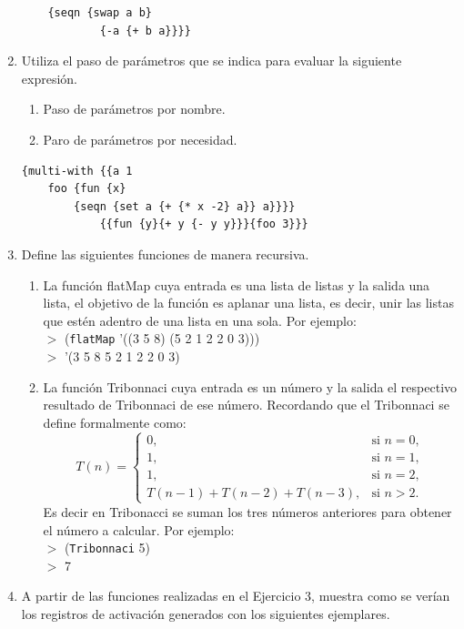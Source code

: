 \documentclass[11pt]{article}
\begin{document}
\begin{enumerate}[leftmargin=0.8cm]
\begin{lstlisting}
    {seqn {swap a b}
            {-a {+ b a}}}}
    \end{lstlisting}
    \item Utiliza el paso de parámetros que se indica para evaluar la siguiente expresión.
    \begin{enumerate}
        \item Paso de parámetros por nombre.
        \item Paro de parámetros por necesidad.\\
    \end{enumerate}
    \begin{lstlisting}
{multi-with {{a 1
    foo {fun {x}
        {seqn {set a {+ {* x -2} a}} a}}}}
            {{fun {y}{+ y {- y y}}}{foo 3}}}
    \end{lstlisting}
    \item Define las siguientes funciones de manera recursiva.
    \begin{enumerate}
        \item La función flatMap cuya entrada es una lista de listas y la salida una lista, el objetivo de la función es aplanar una lista, es decir, unir las listas que estén adentro de una lista en una sola. Por ejemplo:\\
        $>$ (\texttt{flatMap} '((3 5 8) (5 2 1 2 2 0 3)))\\
        $>$ '(3 5 8 5 2 1 2 2 0 3)
        \item La función Tribonnaci cuya entrada es un número y la salida el respectivo resultado de Tribonnaci de ese número. Recordando que el Tribonnaci se define formalmente como:
        \[
            T(n) = \left\{ \begin{array}{ll}
                0, & \text{si } n= 0,\\
                1, & \text{si } n= 1,\\
                1, & \text{si } n= 2,\\
                T(n-1) + T(n-2) + T(n-3), & \text{si } n > 2.
            \end{array}\right.
        \]
        Es decir en Tribonacci se suman los tres números anteriores para obtener el número a calcular. Por ejemplo:\\
        $>$ (\texttt{Tribonnaci} 5)\\
        $>$ 7\\
    \end{enumerate}
    \item A partir de las funciones realizadas en el Ejercicio 3, muestra como se verían los registros de activación generados con los siguientes ejemplares.

\end{enumerate}
\end{document}
